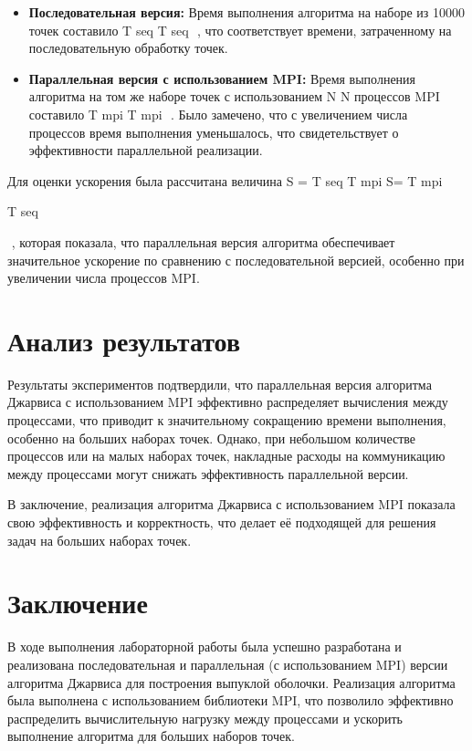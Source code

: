 \documentclass[12pt]{article}
\begin{document}
\begin{itemize}
\item \textbf{Последовательная версия:} Время выполнения алгоритма на наборе из 10000 точек составило 
T
seq
T 
seq
​
 , что соответствует времени, затраченному на последовательную обработку точек.
\item \textbf{Параллельная версия с использованием MPI:} Время выполнения алгоритма на том же наборе точек с использованием 
N
N процессов MPI составило 
T
mpi
T 
mpi
​
 . Было замечено, что с увеличением числа процессов время выполнения уменьшалось, что свидетельствует о эффективности параллельной реализации.
\end{itemize}

Для оценки ускорения была рассчитана величина 
S
=
T
seq
T
mpi
S= 
T 
mpi
​
 
T 
seq
​
 
​
 , которая показала, что параллельная версия алгоритма обеспечивает значительное ускорение по сравнению с последовательной версией, особенно при увеличении числа процессов MPI.

\section*{Анализ результатов}

Результаты экспериментов подтвердили, что параллельная версия алгоритма Джарвиса с использованием MPI эффективно распределяет вычисления между процессами, что приводит к значительному сокращению времени выполнения, особенно на больших наборах точек. Однако, при небольшом количестве процессов или на малых наборах точек, накладные расходы на коммуникацию между процессами могут снижать эффективность параллельной версии.

В заключение, реализация алгоритма Джарвиса с использованием MPI показала свою эффективность и корректность, что делает её подходящей для решения задач на больших наборах точек.

\section*{Заключение}

В ходе выполнения лабораторной работы была успешно разработана и реализована последовательная и параллельная (с использованием MPI) версии алгоритма Джарвиса для построения выпуклой оболочки. Реализация алгоритма была выполнена с использованием библиотеки MPI, что позволило эффективно распределить вычислительную нагрузку между процессами и ускорить выполнение алгоритма для больших наборов точек.
\end{document}
